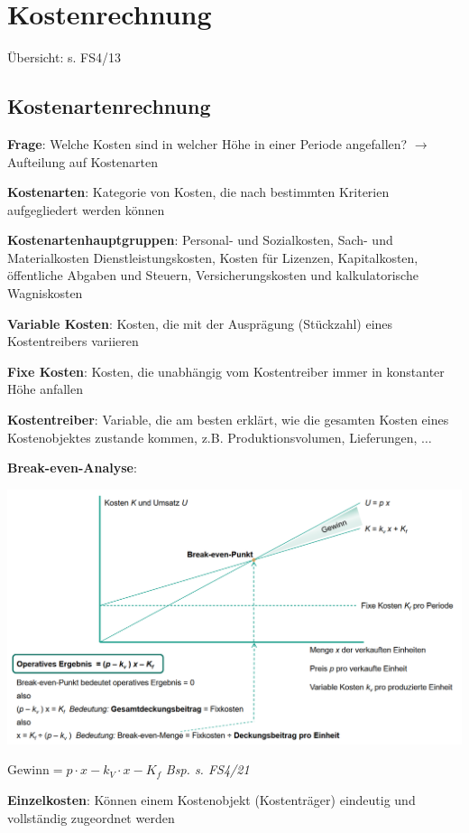 \section{Kostenrechnung}
Übersicht: s. FS4/13
\subsection{Kostenartenrechnung}
\textbf{Frage}: Welche Kosten sind in welcher Höhe in einer Periode angefallen? 
$\rightarrow$ Aufteilung auf Kostenarten

\textbf{Kostenarten}: Kategorie von Kosten, die nach bestimmten Kriterien aufgegliedert werden können

\textbf{Kostenartenhauptgruppen}: Personal- und Sozialkosten, Sach- und Materialkosten
Dienstleistungskosten, Kosten für Lizenzen, Kapitalkosten, öffentliche Abgaben und Steuern, Versicherungskosten und kalkulatorische Wagniskosten

\textbf{Variable Kosten}: Kosten, die mit der Ausprägung (Stückzahl) eines Kostentreibers variieren

\textbf{Fixe Kosten}: Kosten, die unabhängig vom Kostentreiber immer in konstanter Höhe anfallen

\textbf{Kostentreiber}: Variable, die am besten erklärt, wie die gesamten Kosten eines Kostenobjektes zustande kommen, z.B. Produktionsvolumen, Lieferungen, $\ldots$

\textbf{Break-even-Analyse}:
\begin{center}
	\includegraphics[width=\textwidth]{images/be-analyse.png}
\end{center}
$\text{Gewinn}=p\cdot x-k_V\cdot x-K_f$ \qquad\qquad\qquad\qquad\qquad\qquad\textit{Bsp. s. FS4/21}
\bigskip

\textbf{Einzelkosten}: Können einem Kostenobjekt (Kostenträger) eindeutig und vollständig zugeordnet werden

